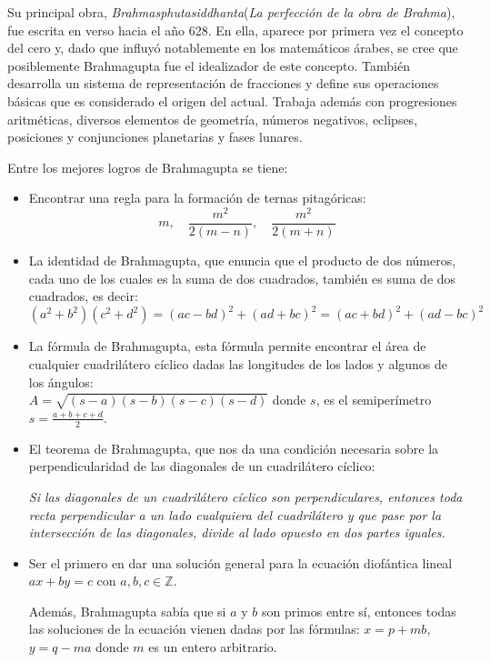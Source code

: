\documentclass[a4paper, 11pt]{article}
\begin{document}
		Su principal obra, \textit{Brahmasphutasiddhanta}(\textit{La perfección de la obra de Brahma}), fue escrita en
		verso hacia el año 628. En ella, aparece por primera vez el concepto del cero y, dado que influyó notablemente
		en los matemáticos árabes, se cree que posiblemente Brahmagupta fue el idealizador de este concepto. También
		desarrolla un sistema de representación de fracciones y define sus operaciones básicas que es considerado el
		origen del actual. Trabaja además con progresiones aritméticas, diversos elementos de geometría, números
		negativos, eclipses, posiciones y conjunciones planetarias y fases lunares.

		Entre los mejores logros de Brahmagupta se tiene:
		\begin{itemize}
			\item Encontrar una regla para la formación de ternas pitagóricas:
			$$ m, \quad {\frac{m^{2}}{2(m-n)}}, \quad {\frac{m^{2}}{2(m+n)}} $$
			\item La identidad de Brahmagupta, que enuncia que el producto de dos números, cada uno de los cuales es la
			suma de dos cuadrados, también es suma de dos cuadrados, es decir:
			$$ (a^2 + b^2)(c^2 + d^2) =(ac - bd)^2 + (ad + bc)^2 = (ac + bd)^2 + (ad-bc)^2 $$
			\item La fórmula de Brahmagupta, esta fórmula permite encontrar el área de cualquier cuadrilátero cíclico
			dadas las longitudes de los lados y algunos de los ángulos: \\
			$\displaystyle A = \sqrt{(s - a)(s - b)(s - c)(s - d)}$ donde $s$, es el semiperímetro $\displaystyle s =
			\frac {a + b + c + d}{2}$. 
			\item El teorema de Brahmagupta, que nos da una condición necesaria sobre la perpendicularidad de las
			diagonales de un cuadrilátero cíclico:
			\begin{center}
				\em Si las diagonales de un cuadrilátero cíclico son perpendiculares, entonces toda recta perpendicular
				a un lado cualquiera del cuadrilátero y que pase por la intersección de las diagonales, divide al lado
				opuesto en dos partes iguales.
			\end{center}
			\item Ser el primero en dar una solución general para la ecuación diofántica lineal $ax + by = c$ con $a,b,c
			\in \mathbb {Z}$.
			
			Además, Brahmagupta sabía que si $a$ y $b$ son primos entre sí, entonces todas las soluciones de la ecuación
			vienen dadas por las fórmulas: $x = p + m b$, $y = q - m a$ donde $m$ es un entero arbitrario.
		\end{itemize}
		
\end{document}
